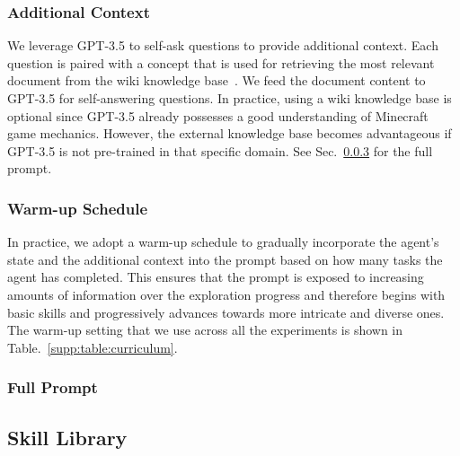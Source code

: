 \subsubsection{Additional Context}
\label{supp:sec:curriculum_context}
We leverage GPT-3.5 to self-ask questions to provide additional context. Each question is paired with a concept that is used for retrieving the most relevant document from the wiki knowledge base~\cite{fan2022minedojo}. We feed the document content to GPT-3.5 for self-answering questions. In practice, using a wiki knowledge base is optional since GPT-3.5 already possesses a good understanding of Minecraft game mechanics. However, the external knowledge base becomes advantageous if GPT-3.5 is not pre-trained in that specific domain. See Sec.~\ref{supp:sec:curriculum_prompt} for the full prompt.

\subsubsection{Warm-up Schedule}
In practice, we adopt a warm-up schedule to gradually incorporate the agent's state and the additional context into the prompt based on how many tasks the agent has completed. This ensures that the prompt is exposed to increasing amounts of information over the exploration progress and therefore begins with basic skills and progressively advances towards more intricate and diverse ones. The warm-up setting that we use across all the experiments is shown in Table.~\ref{supp:table:curriculum}.


\subsubsection{Full Prompt}
\label{supp:sec:curriculum_prompt}

\label{supp:sec:curriculum_prompt-curriculum}




\subsection{Skill Library}
\label{supp:sec:skill_library}
